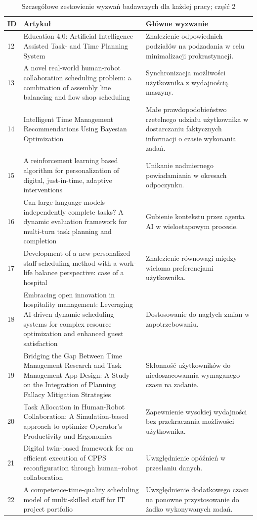 \begin{table}[htbp!]
\caption{Szczegółowe zestawienie wyzwań badawczych dla każdej pracy; część 2}
\label{tab:challenges_summary_2}
\begin{tabular}{p{0.5cm} p{8cm}|p{6.3cm}}
\hline
\textbf{ID} & \textbf{Artykuł} & \textbf{Główne wyzwanie} \\ \hline
12 & Education 4.0: Artificial Intelligence Assisted Task- and Time Planning System & Znalezienie odpowiednich podziałów na podzadania w celu minimalizacji prokrastynacji. \\ \hline
13 & A novel real-world human-robot collaboration scheduling problem: a combination of assembly line balancing and flow shop scheduling & Synchronizacja możliwości użytkownika z wydajnością maszyny. \\ \hline
14 & Intelligent Time Management Recommendations Using Bayesian Optimization & Małe prawdopodobieństwo rzetelnego udziału użytkownika w dostarczaniu faktycznych informacji o czasie wykonania zadań. \\ \hline
15 & A reinforcement learning based algorithm for personalization of digital, just-in-time, adaptive interventions & Unikanie nadmiernego powiadamiania w okresach odpoczynku. \\ \hline
16 & Can large language models independently complete tasks? A dynamic evaluation framework for multi-turn task planning and completion & Gubienie kontekstu przez agenta AI w wieloetapowym procesie. \\ \hline
17 & Development of a new personalized staff-scheduling method with a work-life balance perspective: case of a hospital & Znalezienie równowagi między wieloma preferencjami użytkownika. \\ \hline
18 & Embracing open innovation in hospitality management: Leveraging AI-driven dynamic scheduling systems for complex resource optimization and enhanced guest satisfaction & Dostosowanie do nagłych zmian w zapotrzebowaniu.  \\ \hline
19 & Bridging the Gap Between Time Management Research and Task Management App Design: A Study on the Integration of Planning Fallacy Mitigation Strategies & Skłonność użytkowników do niedoszacowannia wymaganego czasu na zadanie. \\ \hline
20 & Task Allocation in Human-Robot Collaboration: A Simulation-based approach to optimize Operator's Productivity and Ergonomics & Zapewnienie wysokiej wydajności bez przekraczania możliwości użytkownika. \\ \hline
21 & Digital twin-based framework for an efficient execution of CPPS reconfiguration through human–robot collaboration & Uwzględnienie opóźnień w przesłaniu danych. \\ \hline
22 & A competence-time-quality scheduling model of multi-skilled staff for IT project portfolio & Uwzględnienie dodatkowego czasu na ponowne przystosowanie do żadko wykonywanych zadań. \\ \hline
\end{tabular}
\end{table}

